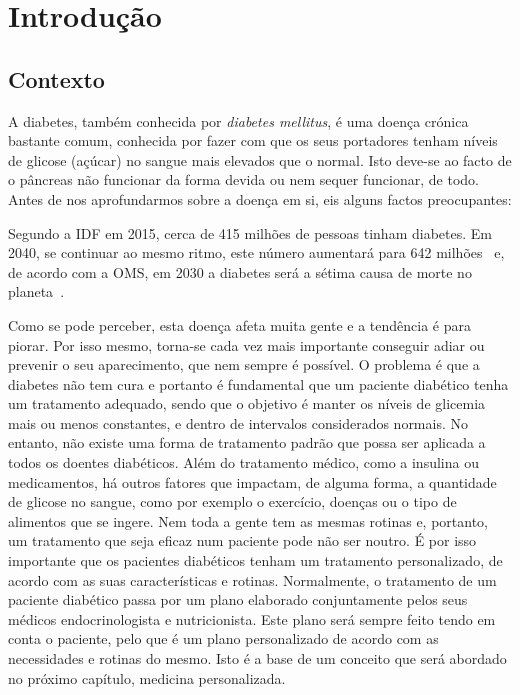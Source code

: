 \chapter{Introdução}\label{chap:intro}

\section{Contexto}

A diabetes, também conhecida por \textit{diabetes mellitus}, é uma doença crónica bastante comum, conhecida por fazer com que os seus portadores tenham níveis de glicose (açúcar) no sangue mais elevados que o normal. Isto deve-se ao facto de o pâncreas não funcionar da forma devida ou nem sequer funcionar, de todo. Antes de nos aprofundarmos sobre a doença em si, eis alguns factos preocupantes:

Segundo a \ac{IDF} em 2015, cerca de 415 milhões de pessoas tinham diabetes. Em 2040, se continuar ao mesmo ritmo, este número aumentará para 642 milhões~\cite{atlas} e, de acordo com a \ac{OMS}, em 2030 a diabetes será a sétima causa de morte no planeta~\cite{who}.

Como se pode perceber, esta doença afeta muita gente e a tendência é para piorar. Por isso mesmo, torna-se cada vez mais importante conseguir adiar ou prevenir o seu aparecimento, que nem sempre é possível. O problema é que a diabetes não tem cura e portanto é fundamental que um paciente diabético tenha um tratamento adequado, sendo que o objetivo é manter os níveis de glicemia mais ou menos constantes, e dentro de intervalos considerados normais. 
No entanto, não existe uma forma de tratamento padrão que possa ser aplicada a todos os doentes diabéticos. Além do tratamento médico, como a insulina ou medicamentos, há outros fatores que impactam, de alguma forma, a quantidade de glicose no sangue, como por exemplo o exercício, doenças ou o tipo de alimentos que se ingere. 
Nem toda a gente tem as mesmas rotinas e, portanto, um tratamento que seja eficaz num paciente pode não ser noutro. É por isso importante que os pacientes diabéticos tenham um tratamento personalizado, de acordo com as suas características e rotinas. Normalmente, o tratamento de um paciente diabético passa por um plano elaborado conjuntamente pelos seus médicos endocrinologista e nutricionista. Este plano será sempre feito tendo em conta o paciente, pelo que é um plano personalizado de acordo com as necessidades e rotinas do mesmo. Isto é a base de um conceito que será abordado no próximo capítulo, medicina personalizada.

